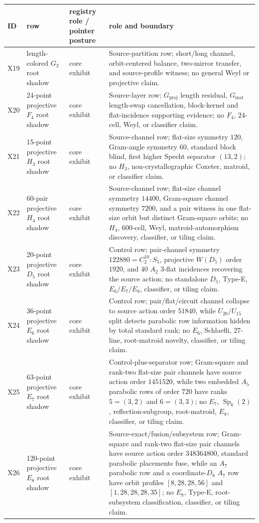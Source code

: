 \begin{center}
\begin{tabular}{@{}L{0.07\textwidth}L{0.30\textwidth}L{0.18\textwidth}L{0.36\textwidth}@{}}
\toprule
ID & row & registry role / pointer posture & role and boundary \\
\midrule
X19 & length-colored \(G_2\) root shadow & core exhibit & Source-partition row; short/long channel, orbit-centered balance, two-mirror transfer, and source-profile witness; no general Weyl or projective claim. \\
X20 & 24-point projective \(F_4\) root shadow & core exhibit & Source-layer row; \(G_{\mathrm{proj}}\) length residual, \(G_{\mathrm{mat}}\) length-swap cancellation, block-kernel and flat-incidence supporting evidence; no \(F_4\), 24-cell, Weyl, or classifier claim. \\
X21 & 15-point projective \(H_3\) root shadow & core exhibit & Source-channel row; flat-size symmetry \(120\), Gram-angle symmetry \(60\), standard block blind, first higher Specht separator \((13,2)\); no \(H_3\), non-crystallographic Coxeter, matroid, or classifier claim. \\
X22 & 60-pair projective \(H_4\) root shadow & core exhibit & Source-channel row; flat-size channel symmetry \(14400\), Gram-square channel symmetry \(7200\), and a pair witness in one flat-size orbit but distinct Gram-square orbits; no \(H_4\), 600-cell, Weyl, matroid-automorphism discovery, classifier, or tiling claim. \\
X23 & 20-point projective \(D_5\) root shadow & core exhibit & Control row; pair-channel symmetry \(122880=C_2^{10}:S_5\), projective \(W(D_5)\) order \(1920\), and \(40\) \(A_2\) 3-flat incidences recovering the source action; no standalone \(D_5\), Type-E, \(E_6/E_7/E_8\), classifier, or tiling claim. \\
X24 & 36-point projective \(E_6\) root shadow & core exhibit & Control row; pair/flat/circuit channel collapse to source action order \(51840\), while \(U_{20}/U_{15}\) split detects parabolic row information hidden by total standard rank; no \(E_6\), Schlaefli, 27-line, root-matroid novelty, classifier, or tiling claim. \\
X25 & 63-point projective \(E_7\) root shadow & core exhibit & Control-plus-separator row; Gram-square and rank-two flat-size pair channels have source action order \(1451520\), while two embedded \(A_5\) parabolic rows of order \(720\) have ranks \(5=(3,2)\) and \(6=(3,3)\); no \(E_7\), \(\operatorname{Sp}_6(2)\), reflection-subgroup, root-matroid, \(E_8\), classifier, or tiling claim. \\
X26 & 120-point projective \(E_8\) root shadow & core exhibit & Source-exact/fusion/subsystem row; Gram-square and rank-two flat-size pair channels have source action order \(348364800\), standard parabolic placements fuse, while an \(A_7\) parabolic row and a coordinate-\(D_8\) \(A_7\) row have orbit profiles \([8,28,28,56]\) and \([1,28,28,28,35]\); no \(E_8\), Type-E, root-subsystem classification, classifier, or tiling claim. \\
\bottomrule
\end{tabular}
\end{center}
\endgroup

